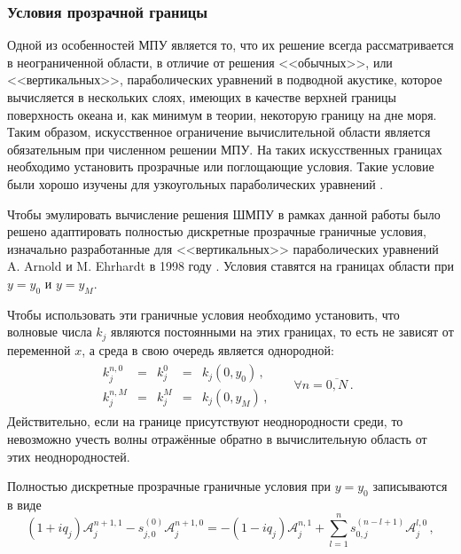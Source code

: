 \documentclass{fefu}
\newcommand{\pa}[1]{\left(#1\right)}
\begin{document}
            \subsubsection{Условия прозрачной границы\label{sec::TBC}}
                \par Одной из особенностей МПУ является то, что их решение всегда рассматривается в неограниченной области, в отличие от решения <<обычных>>, или <<вертикальных>>, параболических уравнений в подводной акустике, которое вычисляется в нескольких слоях, имеющих в качестве верхней границы поверхность океана и, как минимум в теории, некоторую границу на дне моря. Таким образом, искусственное ограничение вычислительной области является обязательным при численном решении МПУ. На таких искусственных границах необходимо установить прозрачные или поглощающие условия. Такие условие были хорошо изучены для узкоугольных параболических уравнений \cite{baskakov,antoine}.
                \par Чтобы эмулировать вычисление решения ШМПУ в рамках данной работы было решено адаптировать полностью дискретные прозрачные граничные условия, изначально разработанные для <<вертикальных>> параболических уравнений A. Arnold и M. Ehrhardt в 1998 году \cite{arnold}. Условия ставятся на границах области при $y=y_0$ и $y=y_M$.
                \par Чтобы использовать эти граничные условия необходимо установить, что волновые числа $k_j$ являются постоянными на этих границах, то есть не зависят от переменной $x$, а среда в свою очередь является однородной:
                \begin{align}
                    \begin{array}{lllll}
                        k_j^{n,0}&=&k_j^0&=&k_j\pa{0,y_0}\,,\\
                        k_j^{n,M}&=&k_j^M&=&k_j\pa{0,y_M}\,,
                    \end{array}
                    &&\forall n=\overline{0,N}\,.&
                \end{align}
                Действительно, если на границе присутствуют неоднородности среди, то невозможно учесть волны отражённые обратно в вычислительную область от этих неоднородностей. 
                \par Полностью дискретные прозрачные граничные условия при $y=y_0$ записываются в виде
                \begin{equation}\label{eq::TBC}
                    \pa{1+iq_j}\mathcal{A}_j^{n+1,1}-s_{j,0}^{\pa{0}}\mathcal{A}_j^{n+1,0}=-\pa{1-iq_j}\mathcal{A}_j^{n,1}+\sum\limits_{l=1}^ns_{0,j}^{\pa{n-l+1}}\mathcal{A}_j^{l,0}\,,
                \end{equation}
\end{document}
